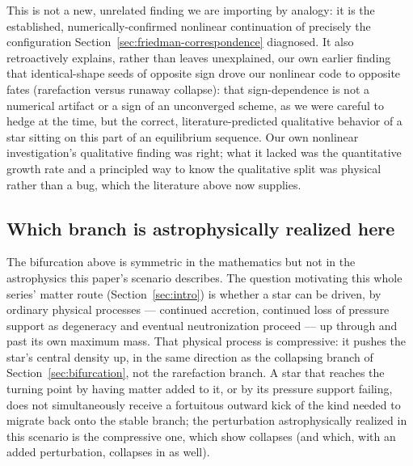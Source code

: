 \documentclass[11pt]{article}
\begin{document}
This is not a new, unrelated finding we are importing by analogy: it is the established, numerically-confirmed nonlinear continuation of precisely the configuration Section~\ref{sec:friedman-correspondence} diagnosed. It also retroactively explains, rather than leaves unexplained, our own earlier finding \citep{OwnbyPhase2} that identical-shape seeds of opposite sign drove our nonlinear code to opposite fates (rarefaction versus runaway collapse): that sign-dependence is not a numerical artifact or a sign of an unconverged scheme, as we were careful to hedge at the time, but the correct, literature-predicted qualitative behavior of a star sitting on this part of an equilibrium sequence. Our own nonlinear investigation's qualitative finding was right; what it lacked was the quantitative growth rate and a principled way to know the qualitative split was physical rather than a bug, which the literature above now supplies.

\subsection{Which branch is astrophysically realized here}
\label{sec:which-branch}

The bifurcation above is symmetric in the mathematics but not in the astrophysics this paper's scenario describes. The question motivating this whole series' matter route (Section~\ref{sec:intro}) is whether a star can be driven, by ordinary physical processes --- continued accretion, continued loss of pressure support as degeneracy and eventual neutronization proceed --- up through and past its own maximum mass. That physical process is compressive: it pushes the star's central density up, in the same direction as the collapsing branch of Section~\ref{sec:bifurcation}, not the rarefaction branch. A star that reaches the turning point by having matter added to it, or by its pressure support failing, does not simultaneously receive a fortuitous outward kick of the kind needed to migrate back onto the stable branch; the perturbation astrophysically realized in this scenario is the compressive one, which \citet{RadiceRezzollaKellermann2010} show collapses (and which, with an added perturbation, collapses in \citealt{FontEtAl2002} as well).
\end{document}
